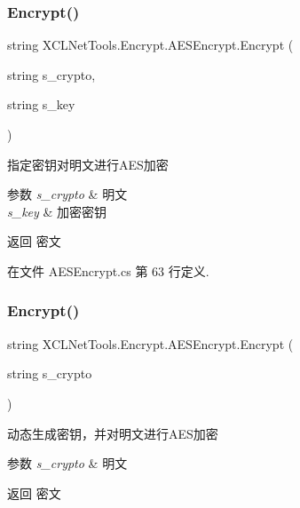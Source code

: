 \subsubsection{\texorpdfstring{Encrypt()}{Encrypt()}\hspace{0.1cm}{\footnotesize\ttfamily [1/2]}}
{\footnotesize\ttfamily string X\+C\+L\+Net\+Tools.\+Encrypt.\+A\+E\+S\+Encrypt.\+Encrypt (\begin{DoxyParamCaption}\item[{string}]{s\+\_\+crypto,  }\item[{string}]{s\+\_\+key }\end{DoxyParamCaption})}



指定密钥对明文进行\+A\+E\+S加密 


\begin{DoxyParams}{参数}
{\em s\+\_\+crypto} & 明文\\
\hline
{\em s\+\_\+key} & 加密密钥\\
\hline
\end{DoxyParams}
\begin{DoxyReturn}{返回}
密文
\end{DoxyReturn}


在文件 A\+E\+S\+Encrypt.\+cs 第 63 行定义.

\mbox{\label{class_x_c_l_net_tools_1_1_encrypt_1_1_a_e_s_encrypt_a7c3fb0d592414659abd08468847c374f}} 
\subsubsection{\texorpdfstring{Encrypt()}{Encrypt()}\hspace{0.1cm}{\footnotesize\ttfamily [2/2]}}
{\footnotesize\ttfamily string X\+C\+L\+Net\+Tools.\+Encrypt.\+A\+E\+S\+Encrypt.\+Encrypt (\begin{DoxyParamCaption}\item[{string}]{s\+\_\+crypto }\end{DoxyParamCaption})}



动态生成密钥，并对明文进行\+A\+E\+S加密 


\begin{DoxyParams}{参数}
{\em s\+\_\+crypto} & 明文\\
\hline
\end{DoxyParams}
\begin{DoxyReturn}{返回}
密文
\end{DoxyReturn}


